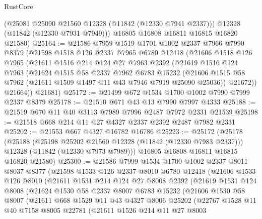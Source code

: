 \begin{lexlean}{RustCore}
\begin{coremodule}
        (@25081 @25090 @21560 @12328 (@11842 (@12330 @7941 @2337)))
        @12328
        (@11842 (@12330 @7931 @7949)))
      @16805
      @16808
      @16811
      @16815
      @16820
      @21580)
@25164 := @21586
    @7959
    @1519
    @1701
    @1002
    @2337
    @7966
    @7990
    @8379
    (@21598
      @1518
      @126
      @2337
      @7965
      @6780
      @12418
      (@21606
        @1518
        @126
        @7965
        (@21611
          @1516
          @214
          @124
          @27
          @7963
          @2392
          (@21619
            @1516
            @124
            @7963
            (@21624
              @1515
              @58
              @2337
              @7962
              @6783
              @15232
              (@21606 @1515 @58 @7962 (@21611 @1509 @1497 @11 @43 @7946 @7919 @25090 @25036))
              @21672))
          @21664))
      @21681)
@25172 := @21499 @672 @1534 @1700 @1002 @7990 @7999 @2337 @8379
@25178 := @21510 @671 @43 @13 @7990 @7997 @4333
@25188 := @21519 @670 @11 @40 @3113 @7989 @7996 @2487 @7972 @2331 @21539
@25198 := @21518 @668 @214 @11 @27 @4327 @2337 @2392 @2487 @7982 @2331
@25202 := @21553 @667 @4327 @16782 @16786
@25223 := @25172
    (@25178
      (@25188
        (@25198 @25202 @21560 @12328 (@11842 (@12330 @7983 @2337)))
        @12328
        (@11842 (@12330 @7973 @7989)))
      @16805
      @16808
      @16811
      @16815
      @16820
      @21580)
@25300 := @21586
    @7999
    @1534
    @1700
    @1002
    @2337
    @8011
    @8037
    @8377
    (@21598
      @1533
      @126
      @2337
      @8010
      @6780
      @12418
      (@21606
        @1533
        @126
        @8010
        (@21611
          @1531
          @214
          @124
          @27
          @8008
          @2392
          (@21619
            @1531
            @124
            @8008
            (@21624
              @1530
              @58
              @2337
              @8007
              @6783
              @15232
              (@21606
                @1530
                @58
                @8007
                (@21611
                  @668
                  @1529
                  @11
                  @43
                  @4327
                  @8006
                  @25202
                  (@22767
                    @1528
                    @11
                    @40
                    @7158
                    @8005
                    @22781
                    (@21611
                      @1526
                      @214
                      @11
                      @27
                      @8003

\end{coremodule}
\end{lexlean}
